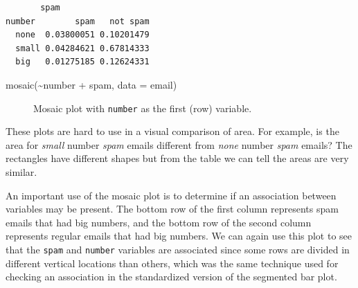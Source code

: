 \documentclass[
  letterpaper,
  DIV=11,
  numbers=noendperiod]{scrreprt}
\newenvironment{Shaded}{\begin{snugshade}}{\end{snugshade}}
\newcommand{\AttributeTok}[1]{\textcolor[rgb]{0.40,0.45,0.13}{#1}}
\newcommand{\FunctionTok}[1]{\textcolor[rgb]{0.28,0.35,0.67}{#1}}
\newcommand{\NormalTok}[1]{\textcolor[rgb]{0.00,0.23,0.31}{#1}}
\newcommand{\SpecialCharTok}[1]{\textcolor[rgb]{0.37,0.37,0.37}{#1}}
\begin{document}
\begin{verbatim}
       spam
number        spam   not spam
  none  0.03800051 0.10201479
  small 0.04284621 0.67814333
  big   0.01275185 0.12624331
\end{verbatim}

\begin{Shaded}
\begin{Highlighting}[]
\FunctionTok{mosaic}\NormalTok{(}\SpecialCharTok{\textasciitilde{}}\NormalTok{number }\SpecialCharTok{+}\NormalTok{ spam, }\AttributeTok{data =}\NormalTok{ email)}
\end{Highlighting}
\end{Shaded}

\begin{figure}[H]


\caption{\label{fig-mosaic62}Mosaic plot with \texttt{number} as the
first (row) variable.}

\end{figure}%

These plots are hard to use in a visual comparison of area. For example,
is the area for \emph{small} number \emph{spam} emails different from
\emph{none} number \emph{spam} emails? The rectangles have different
shapes but from the table we can tell the areas are very similar.

An important use of the mosaic plot is to determine if an association
between variables may be present. The bottom row of the first column
represents spam emails that had big numbers, and the bottom row of the
second column represents regular emails that had big numbers. We can
again use this plot to see that the \texttt{spam} and \texttt{number}
variables are associated since some rows are divided in different
vertical locations than others, which was the same technique used for
checking an association in the standardized version of the segmented bar
plot.
\end{document}
